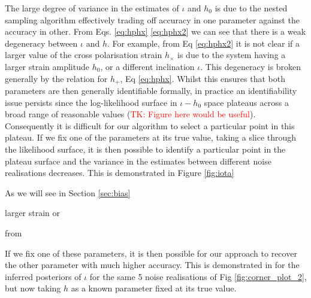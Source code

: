 \documentclass[fleqn,usenatbib,useAMS]{mnras}
\begin{document}
 

 
 The large degree of variance in the estimates of $\iota$ and $h_0$ is due to the nested sampling algorithm effectively trading off accuracy in one parameter against the accuracy in other. From Eqs. \ref{eq:hphx} \ref{eq:hphx2} we can see that there is a weak degeneracy between $\iota$ and $h$. For example, from Eq \ref{eq:hphx2} it is not clear if a larger value of the cross polarisation strain $h_{\times}$ is due to the system having a larger strain amplitude $h_0$, or a different inclination $\iota$. This degeneracy is broken generally by the relation for $h_{+}$, Eq \ref{eq:hphx}. Whilst this ensures that both parameters are then generally identifiable formally, in practice an identifiability issue persists since the log-likelihood surface in $\iota -h_0$ space plateaus across a broad range of reasonable values (\textcolor{red}{TK: Figure here would be useful}).  Consequently it is difficult for our algorithm to select a particular point in this plateau. If we fix one of the parameters at its true value, taking a slice through the likelihood surface, it is then possible to identify a particular point in the plateau surface and the variance in the estimates between different noise realisations decreases. This is demonstrated in Figure \ref{fig:iota}
 
 
 
 







As we will see in Section \ref{sec:bias}
 
 
 
 
 
 
 larger strain or 
 
 
 
 from    
 
 
 

 
 
 If we fix one of these parameters, it is then possible for our approach to recover the other parameter with much higher accuracy. This is demonstrated in 
for the inferred posteriors of $\iota$ for the same 5 noise realisations of Fig \ref{fig:corner_plot_2}, but now taking $h$ as a known parameter fixed at its true value. 
\end{document}
